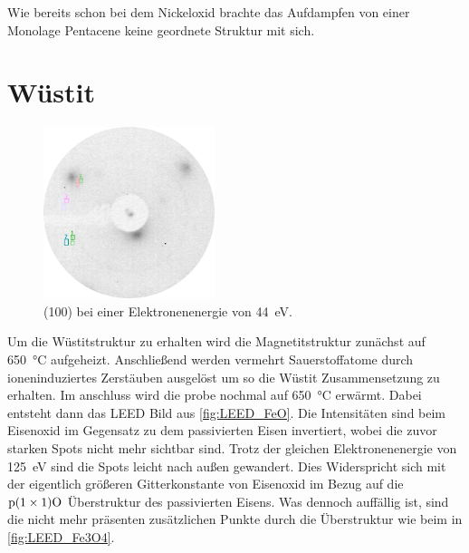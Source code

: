         Wie bereits schon bei dem Nickeloxid brachte das Aufdampfen von einer Monolage Pentacene keine geordnete Struktur mit sich.


    \section{Wüstit}
        \begin{figure}
            \centering
            \includegraphics[height=5cm]{./content/pictures/FeO/2021_09_09_004_FeO_44eV.png}
            \caption{ (100) bei einer Elektronenenergie von \SI{44}{\electronvolt}.}
            \label{fig:LEED_FeO}
        \end{figure}
        Um die Wüstitstruktur zu erhalten wird die Magnetitstruktur zunächst auf \SI{650}{\celsius} aufgeheizt.
        Anschließend werden vermehrt Sauerstoffatome durch ioneninduziertes Zerstäuben ausgelöst um so die Wüstit Zusammensetzung zu erhalten.
        Im anschluss wird die probe nochmal auf \SI{650}{\celsius} erwärmt.
        Dabei entsteht dann das LEED Bild aus \autoref{fig:LEED_FeO}.
        Die Intensitäten sind beim Eisenoxid im Gegensatz zu dem passivierten Eisen invertiert, wobei die zuvor starken Spots nicht mehr sichtbar sind.
        Trotz der gleichen Elektronenenergie von \SI{125}{\electronvolt} sind die Spots leicht nach außen gewandert.
        Dies Widerspricht sich mit der eigentlich größeren Gitterkonstante von Eisenoxid im Bezug auf die $\text{p}(1 \times 1)\ce{O}$ Überstruktur des passivierten Eisens.
        Was dennoch auffällig ist, sind die nicht mehr präsenten zusätzlichen Punkte durch die Überstruktur wie beim  in \autoref{fig:LEED_Fe3O4}.

